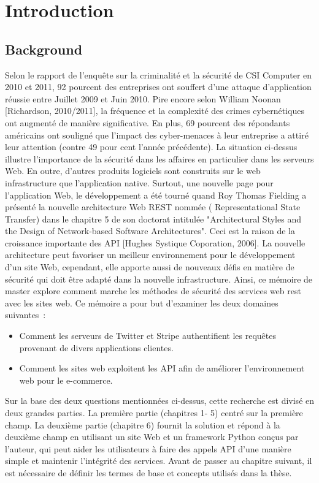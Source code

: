 \chapter{Introduction}
\label{chp: chap1}

\section{Background}
Selon le rapport de l'enquête sur la criminalité et la sécurité de CSI Computer en 2010 et 2011, 92 pourcent des entreprises ont souffert d'une attaque d'application réussie entre Juillet 2009 et Juin 2010. Pire encore selon William Noonan [Richardson, 2010/2011], la fréquence et la complexité des crimes cybernétiques ont augmenté de manière significative. En plus, 69 pourcent des répondants américains ont souligné que l'impact des cyber-menaces à leur entreprise a attiré leur attention (contre 49 pour cent l'année précédente). La situation ci-dessus illustre l'importance de la sécurité dans les affaires en particulier dans les serveurs Web. En outre, d'autres produits logiciels sont construits sur le web infrastructure que l'application native. Surtout, une nouvelle page pour l'application Web,  le développement a été tourné quand Roy Thomas Fielding a présenté la nouvelle architecture  Web REST nommée ( Representational State Transfer) dans le chapitre 5 de son doctorat  intitulée "Architectural Styles and the Design of Network-based Software Architectures". Ceci est la raison de la croissance importante des API [Hughes Systique Coporation, 2006]. La nouvelle architecture peut favoriser un meilleur environnement pour le développement d’un site Web, cependant, elle apporte aussi de nouveaux défis en matière de sécurité qui doit être adapté dans la nouvelle infrastructure. Ainsi, ce mémoire de master explore comment marche les méthodes de sécurité des services web rest avec les sites web.
Ce mémoire a pour but d'examiner les deux domaines suivantes :
\begin{itemize}
\item Comment les serveurs de Twitter et Stripe authentifient les requêtes provenant de divers applications clientes.
\item Comment les sites web exploitent les API afin de améliorer l'environnement web pour le e-commerce.
\end{itemize}
Sur la base des deux questions mentionnées ci-dessus, cette recherche est divisé en deux grandes parties. La première partie (chapitres 1- 5) centré sur la première champ. La deuxième partie (chapitre 6) fournit la solution et répond à la deuxième champ en utilisant un site Web et un framework Python conçus par l'auteur, qui peut aider les utilisateurs à faire des appels API d'une manière simple et maintenir l'intégrité des services.
Avant de passer au chapitre suivant, il est nécessaire de définir les termes de base et
concepts utilisés dans la thèse.

